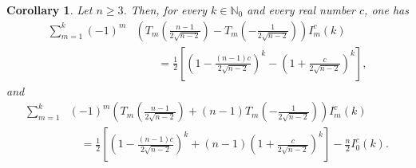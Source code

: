 \documentclass[reqno,10pt]{amsart}
\newtheorem{corollary}[theorem]{Corollary}
\theoremstyle{definition}
\numberwithin{equation}{section}
\begin{document}
\begin{corollary}\label{cor:Kn_c_identities}
Let $n\ge3$. Then, for every $k\in\mathbb N_0$ and every real number $c$, one has
\begin{equation}\label{eq:Kn_first_identity}
\begin{split}
\sum_{m=1}^{k}
(-1)^m
&\left(
T_m\!\left(\frac{n-1}{2\sqrt{n-2}}\right)
-
T_m\!\left(-\frac{1}{2\sqrt{n-2}}\right)
\right)
I_m^{c}(k)\\
&\qquad =
\frac12
\left[
\left(1-\frac{(n-1)c}{2\sqrt{n-2}}\right)^k
-
\left(1+\frac{c}{2\sqrt{n-2}}\right)^k
\right],
\end{split}
\end{equation}
and 
\begin{equation}\label{eq:Kn_second_identity}
\begin{split}
\sum_{m=1}^{k}&
(-1)^m
\left(
T_m\!\left(\frac{n-1}{2\sqrt{n-2}}\right)
+
(n-1)T_m\!\left(-\frac{1}{2\sqrt{n-2}}\right)
\right)
I_m^{c}(k)\\
&\quad =
\frac12
\left[
\left(1-\frac{(n-1)c}{2\sqrt{n-2}}\right)^k
+
(n-1)
\left(1+\frac{c}{2\sqrt{n-2}}\right)^k
\right]
-\frac{n}{2}I_0^c(k).
\end{split}
\end{equation}
\end{corollary}
\end{document}
